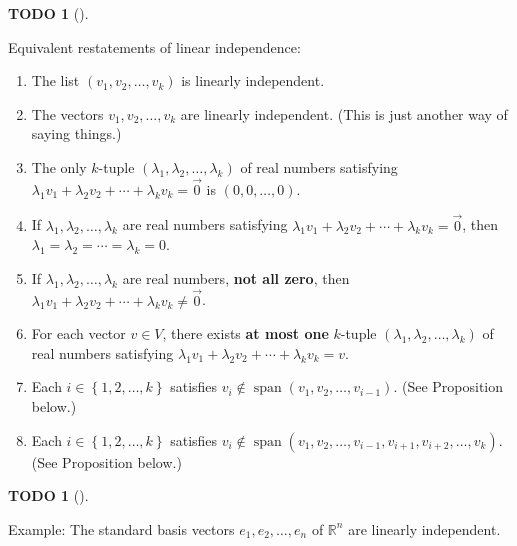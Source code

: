 \documentclass[numbers=enddot,12pt,final,onecolumn,notitlepage]{scrartcl}%
\theoremstyle{definition}
\newtheorem{quest}[theo]{TODO}
\newenvironment{todo}[1][]
{\begin{quest}[#1]\begin{leftbar}}
{\end{leftbar}\end{quest}}
\begin{document}
\begin{todo}
Equivalent restatements of linear independence:

\begin{enumerate}
\item The list $\left(  v_{1},v_{2},\ldots,v_{k}\right)  $ is linearly independent.

\item The vectors $v_{1},v_{2},\ldots,v_{k}$ are linearly independent. (This
is just another way of saying things.)

\item The only $k$-tuple $\left(  \lambda_{1},\lambda_{2},\ldots,\lambda
_{k}\right)  $ of real numbers satisfying $\lambda_{1}v_{1}+\lambda_{2}%
v_{2}+\cdots+\lambda_{k}v_{k}=\overrightarrow{0}$ is $\left(  0,0,\ldots
,0\right)  $.

\item If $\lambda_{1},\lambda_{2},\ldots,\lambda_{k}$ are real numbers
satisfying $\lambda_{1}v_{1}+\lambda_{2}v_{2}+\cdots+\lambda_{k}%
v_{k}=\overrightarrow{0}$, then $\lambda_{1}=\lambda_{2}=\cdots=\lambda_{k}=0$.

\item If $\lambda_{1},\lambda_{2},\ldots,\lambda_{k}$ are real numbers,
\textbf{not all zero}, then $\lambda_{1}v_{1}+\lambda_{2}v_{2}+\cdots
+\lambda_{k}v_{k}\neq\overrightarrow{0}$.

\item For each vector $v\in V$, there exists \textbf{at most one} $k$-tuple
$\left(  \lambda_{1},\lambda_{2},\ldots,\lambda_{k}\right)  $ of real numbers
satisfying $\lambda_{1}v_{1}+\lambda_{2}v_{2}+\cdots+\lambda_{k}v_{k}=v$.

\item Each $i\in\left\{  1,2,\ldots,k\right\}  $ satisfies $v_{i}%
\notin\operatorname*{span}\left(  v_{1},v_{2},\ldots,v_{i-1}\right)  $. (See
Proposition below.)

\item Each $i\in\left\{  1,2,\ldots,k\right\}  $ satisfies $v_{i}%
\notin\operatorname*{span}\left(  v_{1},v_{2},\ldots,v_{i-1},v_{i+1}%
,v_{i+2},\ldots,v_{k}\right)  $. (See Proposition below.)
\end{enumerate}
\end{todo}

\begin{todo}
Example: The standard basis vectors $e_{1},e_{2},\ldots,e_{n}$ of
$\mathbb{R}^{n}$ are linearly independent.
\end{todo}
\end{document}
